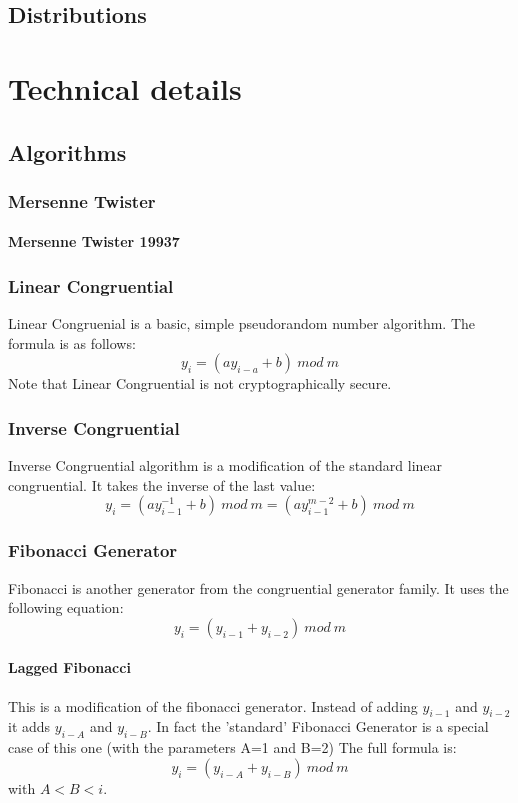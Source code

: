 \documentclass{scrartcl}
\begin{document}
\subsection{Distributions}

\section{Technical details}
\subsection{Algorithms}
\subsubsection{Mersenne Twister}
\paragraph{Mersenne Twister 19937}
\subsubsection{Linear Congruential}
Linear Congruenial is a basic, simple pseudorandom number algorithm. The formula is as follows:
\begin{equation} y_i = (a{y}_{i-a}+b)\:mod\:m \end{equation}
Note that Linear Congruential is not cryptographically secure.
\subsubsection{Inverse Congruential}
Inverse Congruential algorithm is a modification of the standard linear congruential. It takes the inverse of the last value:
\begin{equation}y_i = (a{y}_{i-1}^{-1}+b)\:mod\:m = (a{y}_{i-1}^{m-2}+b)\:mod\:m \end{equation}
\subsubsection{Fibonacci Generator}
Fibonacci is another generator from the congruential generator family. It uses the following equation:
\begin{equation} y_i = (y_{i-1}+y_{i-2})\:mod\:m \end{equation}
\paragraph{Lagged Fibonacci}
This is a modification of the fibonacci generator.  Instead of adding $y_{i-1}$ and $y_{i-2}$ it adds $y_{i-A}$ and $y_{i-B}$. In fact the 'standard' Fibonacci Generator is a special case of this one (with the parameters A=1 and B=2)\newline
The full formula is:
\begin{equation}y_i = (y_{i-A} + y_{i-B})\:mod\:m\end{equation}
with $A < B < i$.
\end{document}
